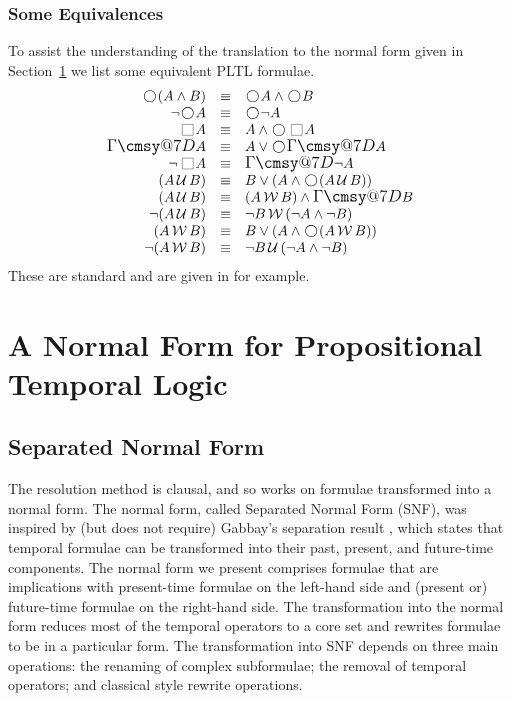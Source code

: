 \documentclass[nohyperref]{acmtrans2f}
\makeatletter
\def\sometime{\mathord{\hbox{\large$\mathchar"0\cmsy@7D$}}}
\newcommand{\always}{\raisebox{-.2ex}{
                           \mbox{\unitlength=0.9ex
                           \begin{picture}(2,2)
                           \linethickness{0.06ex}
                           \put(0,0){\line(1,0){2}}
                           \put(0,2){\line(1,0){2}}
                           \put(0,0){\line(0,1){2}}
                           \put(2,0){\line(0,1){2}}
                           \end{picture}}}
                          \,}
\newcommand{\next}{\!\raisebox{-.2ex}{ %
                        \mbox{\unitlength=0.9ex
                        \begin{picture}(2,2)
                        \linethickness{0.06ex}
                        \put(1,1){\circle{2}} %
                        \end{picture}}}       %
                        \,}
\def\until{\hbox{$\,\cal U \,$}}
\def\unless{\hbox{$\,\cal W \,$}}
\makeatother
\begin{document}
\subsubsection{Some Equivalences}
\label{equiv}
To assist the understanding of the translation to the normal form given
in Section~\ref{normal.form} we list some equivalent PLTL formulae.
$$
\begin{array}{rcl}
\next(A \land B) & \equiv & \next A \land \next B \\
\neg \next A & \equiv & \next \neg A \\
\always A & \equiv & A \land \next \always A \\
\sometime A & \equiv & A \lor \next \sometime A \\
\neg \always A & \equiv & \sometime \neg A \\
(A \until B) & \equiv & B \lor (A \land \next(A \until B)) \\
(A \until B) & \equiv & (A \unless B) \land \sometime B \\
\neg (A \until B) & \equiv & \neg B \unless (\neg A \land \neg B) \\
(A \unless B) & \equiv & B \lor (A \land \next(A \unless B)) \\
\neg (A \unless B) & \equiv & \neg B \until (\neg A \land \neg B) \\
\end{array}
$$
These are standard and are given in  for example.
\section{A Normal Form for Propositional Temporal Logic}
\label{normal.form}
%
\subsection{Separated Normal Form}
\label{sub.snf}
%
The resolution method is clausal, and so works on formulae transformed
into a normal form. The normal form, called Separated Normal Form
(SNF), was inspired by (but does not require) Gabbay's separation
result \cite{Gab89}, which states that temporal formulae can be
transformed into their past, present, and future-time components. The
normal form we present comprises formulae that are implications with
present-time formulae on the left-hand side and (present or)
future-time formulae on the right-hand side.  The transformation into
the normal form reduces most of the temporal operators to a core set
and rewrites formulae to be in a particular form. The transformation
into SNF depends on three main operations: the renaming of complex
subformulae; the removal of temporal operators; and classical style
rewrite operations.
\end{document}
